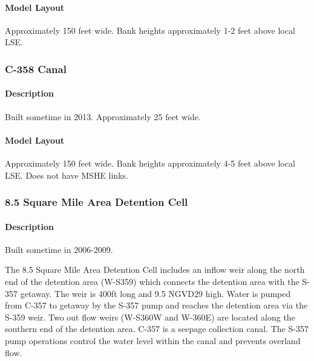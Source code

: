 \paragraph{Model Layout}
Approximately 150 feet wide.  Bank heights approximately 1-2 feet above local LSE.


\subsubsection{C-358 Canal}

\paragraph{Description}
Built sometime in 2013.
Approximately 25 feet wide.

\paragraph{Model Layout}
Approximately 150 feet wide. Bank heights approximately 4-5 feet above local LSE. Does not have MSHE links.


\subsubsection{8.5 Square Mile Area Detention Cell}

\paragraph{Description}

Built sometime in 2006-2009.

The 8.5 Square Mile Area Detention Cell includes an inflow weir along the north end of the detention area (W-S359) which connects the detention area with the S-357 getaway. The weir is 400ft long and 9.5 NGVD29 high. Water is pumped from C-357 to getaway by the S-357 pump and reaches the detention area via the S-359 weir. Two out flow weirs (W-S360W and W-360E) are located along the southern end of the detention area. C-357 is a seepage collection canal. The S-357 pump operations control the water level within the canal and prevents overland flow.

